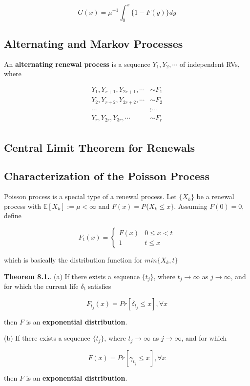 \documentclass[12pt]{article}
\theoremstyle{nonumberbreak}
\begin{document}
$$
G(x) = \mu^{-1} \int_0^x \{ 1 - F(y) \} dy
$$




\subsection{Alternating and Markov Processes}

An \textbf{alternating renewal process} is a sequence $Y_1, Y_2, \cdots$ of independent RVs, where

$$
\begin{aligned}
Y_1, Y_{r+1}, Y_{2r+1}, \cdots &\sim F_1 \\[8pt]
Y_2, Y_{r+2}, Y_{2r+2}, \cdots &\sim F_2 \\[8pt]
\cdots &\vdots \cdots \\[8pt]
Y_r, Y_{2r},  Y_{3r},   \cdots &\sim F_r \\[8pt]
\end{aligned}
$$



\subsection{Central Limit Theorem for Renewals}




\subsection{Characterization of the Poisson Process}

Poisson process is a special type of a renewal process. Let $\{ X_k \}$ be a renewal process with $\mathbb{E} [X_k] := \mu < \infty$ and $F(x) = P \{ X_k \le x \}$. Assuming $F(0) = 0$, define

$$
F_t(x) = \begin{cases}
F(x) & 0 \le x < t \\[8pt]
1 & t \le x
\end{cases}
$$

which is basically the distribution function for $min \{ X_k, t \}$



\begin{theorem}
\textbf{Theorem 8.1.}.
(a) If there exists a sequence $\{ t_j \}$, where $t_j \to \infty$ as $j \to \infty$, and for which the current life $\delta_t$ satisfies 

$$
F_{t_j} (x) = Pr[ \delta_{t_j} \le x ], \forall x
$$

then $F$ is an \textbf{exponential distribution}.

(b) If there exists a sequence $\{ t_j \}$,  where $t_j \to \infty$ as $j \to \infty$, and for which

$$
F(x) = Pr [ \gamma_{t_j} \le x], \forall x
$$

then $F$ is an \textbf{exponential distribution}.
\end{theorem}
\end{document}

